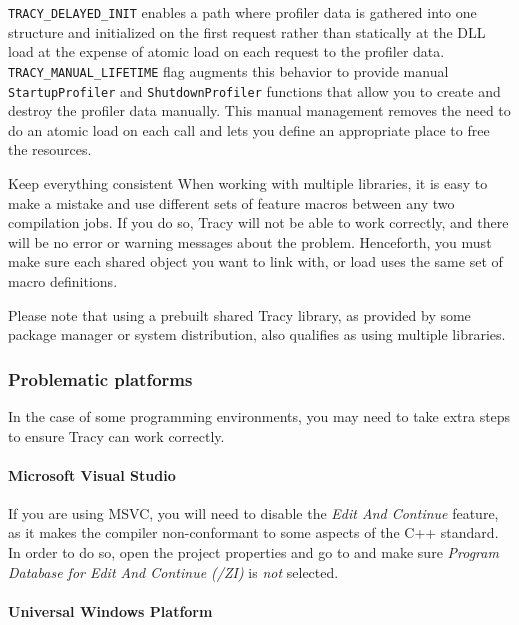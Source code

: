 \documentclass[hidelinks,titlepage,a4paper]{article}
\begin{document}
\texttt{TRACY\_DELAYED\_INIT} enables a path where profiler data is gathered into one structure and initialized on the first request rather than statically at the DLL load at the expense of atomic load on each request to the profiler data. \texttt{TRACY\_MANUAL\_LIFETIME} flag augments this behavior to provide manual \texttt{StartupProfiler} and \texttt{ShutdownProfiler} functions that allow you to create and destroy the profiler data manually. This manual management removes the need to do an atomic load on each call and lets you define an appropriate place to free the resources.

\begin{bclogo}[
noborder=true,
couleur=black!5,
logo=\bcbombe
]{Keep everything consistent}
When working with multiple libraries, it is easy to make a mistake and use different sets of feature macros between any two compilation jobs. If you do so, Tracy will not be able to work correctly, and there will be no error or warning messages about the problem. Henceforth, you must make sure each shared object you want to link with, or load uses the same set of macro definitions.

Please note that using a prebuilt shared Tracy library, as provided by some package manager or system distribution, also qualifies as using multiple libraries.
\end{bclogo}

\subsubsection{Problematic platforms}

In the case of some programming environments, you may need to take extra steps to ensure Tracy can work correctly.

\paragraph{Microsoft Visual Studio}

If you are using MSVC, you will need to disable the \emph{Edit And Continue} feature, as it makes the compiler non-conformant to some aspects of the C++ standard. In order to do so, open the project properties and go to  and make sure \emph{Program Database for Edit And Continue (/ZI)} is \emph{not} selected.

\paragraph{Universal Windows Platform}
\end{document}
